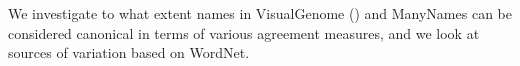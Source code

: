 %

We investigate to what extent names in VisualGenome (\vg) and ManyNames can be considered canonical in terms of various agreement measures,
and we look at sources of variation based on WordNet. %

